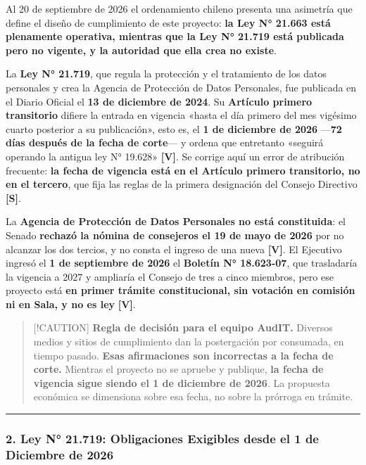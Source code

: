 Al 20 de septiembre de 2026 el ordenamiento chileno presenta una asimetría que define el diseño de cumplimiento de este proyecto: \textbf{la Ley N° 21.663 está plenamente operativa, mientras que la Ley N° 21.719 está publicada pero no vigente, y la autoridad que ella crea no existe}.

La \textbf{Ley N° 21.719}, que regula la protección y el tratamiento de los datos personales y crea la Agencia de Protección de Datos Personales, fue publicada en el Diario Oficial el \textbf{13 de diciembre de 2024}. Su \textbf{Artículo primero transitorio} difiere la entrada en vigencia «hasta el día primero del mes vigésimo cuarto posterior a su publicación», esto es, el \textbf{1 de diciembre de 2026} ---\textbf{72 días después de la fecha de corte}--- y ordena que entretanto «seguirá operando la antigua ley N° 19.628» \textbf{{[}V{]}}. Se corrige aquí un error de atribución frecuente: \textbf{la fecha de vigencia está en el Artículo primero transitorio, no en el tercero}, que fija las reglas de la primera designación del Consejo Directivo \textbf{{[}S{]}}.

La \textbf{Agencia de Protección de Datos Personales no está constituida}: el Senado \textbf{rechazó la nómina de consejeros el 19 de mayo de 2026} por no alcanzar los dos tercios, y no consta el ingreso de una nueva \textbf{{[}V{]}}. El Ejecutivo ingresó el \textbf{1 de septiembre de 2026} el \textbf{Boletín N° 18.623-07}, que trasladaría la vigencia a 2027 y ampliaría el Consejo de tres a cinco miembros, pero ese proyecto está \textbf{en primer trámite constitucional, sin votación en comisión ni en Sala, y no es ley} \textbf{{[}V{]}}.

\begin{quote}
{[}!CAUTION{]} \textbf{Regla de decisión para el equipo AudIT.} Diversos medios y sitios de cumplimiento dan la postergación por consumada, en tiempo pasado. \textbf{Esas afirmaciones son incorrectas a la fecha de corte.} Mientras el proyecto no se apruebe y publique, \textbf{la fecha de vigencia sigue siendo el 1 de diciembre de 2026}. La propuesta económica se dimensiona sobre esa fecha, no sobre la prórroga en trámite.
\end{quote}

\begin{center}\rule{0.5\linewidth}{0.5pt}\end{center}

\subsubsection{2. Ley N° 21.719: Obligaciones Exigibles desde el 1 de Diciembre de 2026}\label{ley-n-21.719-obligaciones-exigibles-desde-el-1-de-diciembre-de-2026}

